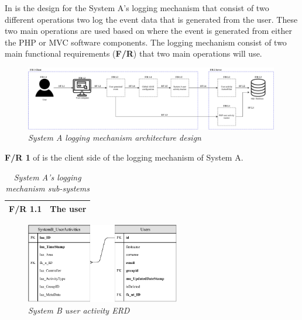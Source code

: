 In  is the design for the System A's logging mechanism that consist of two different operations two log the event data that is generated from the user. These two main operations are used based on where the event is generated from either the PHP or MVC software components. The logging mechanism consist of two main functional requirements (\textbf{F/R}) that two main operations will use.

\begin{figure}[!htb] %
	\centering %
	\includegraphics[width=0.99\textwidth]{Images/Chapter2/SystemA_Architecture_Diagram/SystemA_Architecture_Diagram.pdf}
	\caption[System A logging mechanism architecture design]
	{\textit{System A logging mechanism architecture design}}\label{fig:SystemA_Arch_Design}
\end{figure}

\textbf{F/R 1} of  is the client side of the logging mechanism of System A.

\begin{table}[!htb]
	\centering
	\small
	\caption[System A's logging mechanism sub-systems]
	{\textit{System A's logging mechanism sub-systems}}
	\label{tbl:SystemA_SubSystems}
	\begin{tabularx}{\textwidth}{|l|X|}
		\hline \textbf{F/R 1.1} & The user \\
		\hline
	\end{tabularx}
\end{table}

\clearpage

\begin{figure}[!htb] %
	\centering %
	\includegraphics[width=0.6\textwidth]{Images/Chapter2/SystemB_ERD_Basic/SystemB_ERD_Basic.pdf}
	\caption[System B user activity ERD]
	{\textit{System B user activity ERD}}\label{fig:SystemB_Basic_ERD}
\end{figure}

